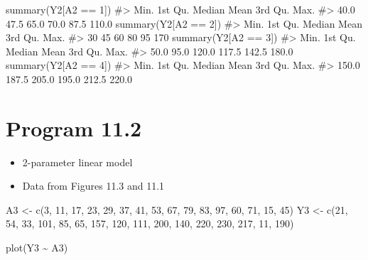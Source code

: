 \documentclass[
  10pt,
  a4paper,
]{book}
\newenvironment{Shaded}{\begin{snugshade}}{\end{snugshade}}
\newcommand{\CommentTok}[1]{\textcolor[rgb]{0.37,0.37,0.37}{#1}}
\newcommand{\DecValTok}[1]{\textcolor[rgb]{0.68,0.00,0.00}{#1}}
\newcommand{\FunctionTok}[1]{\textcolor[rgb]{0.28,0.35,0.67}{#1}}
\newcommand{\NormalTok}[1]{\textcolor[rgb]{0.00,0.46,0.62}{#1}}
\newcommand{\OtherTok}[1]{\textcolor[rgb]{0.00,0.46,0.62}{#1}}
\newcommand{\SpecialCharTok}[1]{\textcolor[rgb]{0.37,0.37,0.37}{#1}}
\providecommand{\tightlist}{%
  \setlength{\itemsep}{0pt}\setlength{\parskip}{0pt}}
\begin{document}
\begin{Shaded}
\begin{Highlighting}[]
\FunctionTok{summary}\NormalTok{(Y2[A2 }\SpecialCharTok{==} \DecValTok{1}\NormalTok{])}
\CommentTok{\#\textgreater{}    Min. 1st Qu.  Median    Mean 3rd Qu.    Max. }
\CommentTok{\#\textgreater{}    40.0    47.5    65.0    70.0    87.5   110.0}
\FunctionTok{summary}\NormalTok{(Y2[A2 }\SpecialCharTok{==} \DecValTok{2}\NormalTok{])}
\CommentTok{\#\textgreater{}    Min. 1st Qu.  Median    Mean 3rd Qu.    Max. }
\CommentTok{\#\textgreater{}      30      45      60      80      95     170}
\FunctionTok{summary}\NormalTok{(Y2[A2 }\SpecialCharTok{==} \DecValTok{3}\NormalTok{])}
\CommentTok{\#\textgreater{}    Min. 1st Qu.  Median    Mean 3rd Qu.    Max. }
\CommentTok{\#\textgreater{}    50.0    95.0   120.0   117.5   142.5   180.0}
\FunctionTok{summary}\NormalTok{(Y2[A2 }\SpecialCharTok{==} \DecValTok{4}\NormalTok{])}
\CommentTok{\#\textgreater{}    Min. 1st Qu.  Median    Mean 3rd Qu.    Max. }
\CommentTok{\#\textgreater{}   150.0   187.5   205.0   195.0   212.5   220.0}
\end{Highlighting}
\end{Shaded}

\section{Program 11.2}\label{program-11.2}

\begin{itemize}
\tightlist
\item
  2-parameter linear model
\item
  Data from Figures 11.3 and 11.1
\end{itemize}

\begin{Shaded}
\begin{Highlighting}[]
\NormalTok{A3 }\OtherTok{\textless{}{-}}
  \FunctionTok{c}\NormalTok{(}\DecValTok{3}\NormalTok{, }\DecValTok{11}\NormalTok{, }\DecValTok{17}\NormalTok{, }\DecValTok{23}\NormalTok{, }\DecValTok{29}\NormalTok{, }\DecValTok{37}\NormalTok{, }\DecValTok{41}\NormalTok{, }\DecValTok{53}\NormalTok{, }\DecValTok{67}\NormalTok{, }\DecValTok{79}\NormalTok{, }\DecValTok{83}\NormalTok{, }\DecValTok{97}\NormalTok{, }\DecValTok{60}\NormalTok{, }\DecValTok{71}\NormalTok{, }\DecValTok{15}\NormalTok{, }\DecValTok{45}\NormalTok{)}
\NormalTok{Y3 }\OtherTok{\textless{}{-}}
  \FunctionTok{c}\NormalTok{(}\DecValTok{21}\NormalTok{, }\DecValTok{54}\NormalTok{, }\DecValTok{33}\NormalTok{, }\DecValTok{101}\NormalTok{, }\DecValTok{85}\NormalTok{, }\DecValTok{65}\NormalTok{, }\DecValTok{157}\NormalTok{, }\DecValTok{120}\NormalTok{, }\DecValTok{111}\NormalTok{, }\DecValTok{200}\NormalTok{, }\DecValTok{140}\NormalTok{, }\DecValTok{220}\NormalTok{, }\DecValTok{230}\NormalTok{, }\DecValTok{217}\NormalTok{,}
    \DecValTok{11}\NormalTok{, }\DecValTok{190}\NormalTok{)}

\FunctionTok{plot}\NormalTok{(Y3 }\SpecialCharTok{\textasciitilde{}}\NormalTok{ A3)}
\end{Highlighting}
\end{Shaded}
\end{document}
